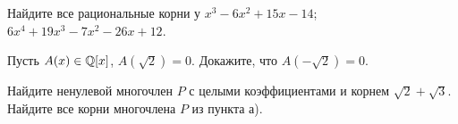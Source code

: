 \documentclass[a4paper,12pt]{article}
\newcommand{\0}[1]{\overline{#1}}
\begin{document}
 Найдите все рациональные корни у
 $x^3-6x^2+15x-14$;
 $6x^4+19x^3-7x^2-26x+12$.

Пусть $A(x)\in\mathbb{Q}[x]$, $A(\sqrt2)=0$. Докажите, что $A(-\sqrt2)=0.$

Найдите ненулевой
многочлен $P$ с целыми коэффициентами и корнем
$\sqrt2+\sqrt3$.\\
 Найдите все корни многочлена $P$ из пункта а).

\end{document}
